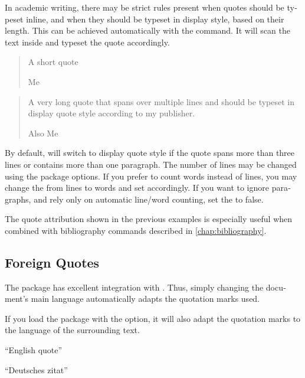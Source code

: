 In academic writing, there may be strict rules present when quotes should be
typeset inline, and when they should be typeset in display style, based on their
length. This can be achieved automatically with the  command.
It will scan the text inside and typeset the quote accordingly.
\begin{example}[examplewidth=0.5\textwidth]
\csdisplaytrue%
\blockquote[Me]{A short quote}

\blockquote[Also Me]{A very long
  quote that spans over multiple
  lines and should be typeset in
  display quote style
  according to my publisher.}
\end{example}
By default,  will switch to display quote style if the quote
spans more than three lines or contains more than one paragraph. The number of
lines may be changed using the  package options. If you prefer
to count words instead of lines, you may change the  from
lines to words and set  accordingly. If you want to ignore
paragraphs, and rely only on automatic line\slash{}word counting, set the
 to false.

The quote attribution shown in the previous examples is especially useful when
combined with bibliography commands described in
\autoref{chap:bibliography}.

\subsection{Foreign Quotes}

The  package has excellent integration with .
Thus, simply changing the document's main language automatically adapts the
quotation marks used.
\begin{example}
\setmainlanguage{french}

\end{example}

If you load the package with the  option, it will also adapt
the quotation marks to the language of the surrounding text.
\begin{example}
\usepackage[autostyle]{csquotes}

\enquote{English quote}

\begin{german}
  \enquote{Deutsches zitat}
\end{german}
\end{example}

